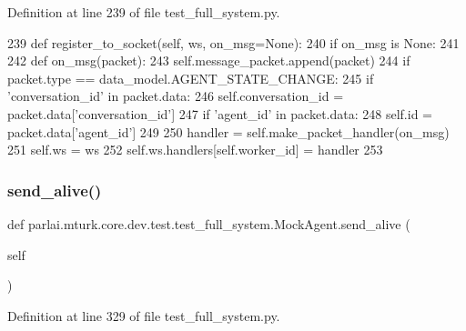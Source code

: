 Definition at line 239 of file test\+\_\+full\+\_\+system.\+py.


\begin{DoxyCode}
239     \textcolor{keyword}{def }register\_to\_socket(self, ws, on\_msg=None):
240         \textcolor{keywordflow}{if} on\_msg \textcolor{keywordflow}{is} \textcolor{keywordtype}{None}:
241 
242             \textcolor{keyword}{def }on\_msg(packet):
243                 self.message\_packet.append(packet)
244                 \textcolor{keywordflow}{if} packet.type == data\_model.AGENT\_STATE\_CHANGE:
245                     \textcolor{keywordflow}{if} \textcolor{stringliteral}{'conversation\_id'} \textcolor{keywordflow}{in} packet.data:
246                         self.conversation\_id = packet.data[\textcolor{stringliteral}{'conversation\_id'}]
247                     \textcolor{keywordflow}{if} \textcolor{stringliteral}{'agent\_id'} \textcolor{keywordflow}{in} packet.data:
248                         self.id = packet.data[\textcolor{stringliteral}{'agent\_id'}]
249 
250         handler = self.make\_packet\_handler(on\_msg)
251         self.ws = ws
252         self.ws.handlers[self.worker\_id] = handler
253 
\end{DoxyCode}
\mbox{\label{classparlai_1_1mturk_1_1core_1_1dev_1_1test_1_1test__full__system_1_1MockAgent_a2a8aaa90f95349b4de8517bfd6d010d6}} 
\subsubsection{\texorpdfstring{send\+\_\+alive()}{send\_alive()}}
{\footnotesize\ttfamily def parlai.\+mturk.\+core.\+dev.\+test.\+test\+\_\+full\+\_\+system.\+Mock\+Agent.\+send\+\_\+alive (\begin{DoxyParamCaption}\item[{}]{self }\end{DoxyParamCaption})}



Definition at line 329 of file test\+\_\+full\+\_\+system.\+py.


